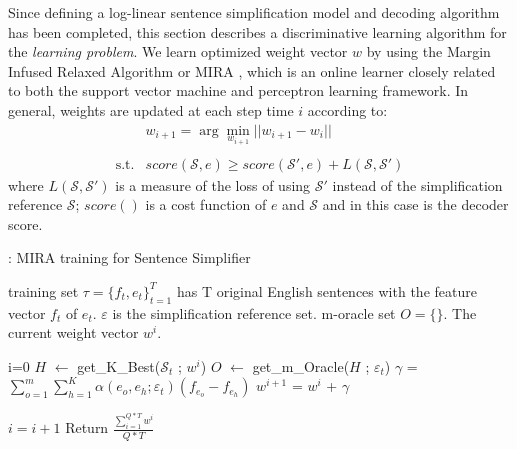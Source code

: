 \documentclass[10pt]{article}
\begin{document}
Since defining a log-linear sentence simplification model and decoding algorithm has been completed, this section describes a discriminative learning algorithm for the \textit{learning problem}.
We learn optimized weight vector $w$ by using the Margin Infused Relaxed Algorithm or MIRA \cite{MIRA:2003}, which is an online learner closely related to both the support vector machine and perceptron learning framework.
In general, weights are updated at each step time $i$ according to:
\begin{equation}
\begin{array}{cc}
& w_{i+1}  = \arg\min_{w_{i+1}} ||w_{i+1} - w_i||   \\
\\
\mbox{s.t.} & score(\mathcal{S},e) \geq score(\mathcal{S}',e) + L(\mathcal{S},\mathcal{S}') 
\end{array}
\end{equation}
where $L(\mathcal{S},\mathcal{S}')$ is a measure of the loss of using $\mathcal{S}'$ instead of the simplification reference $\mathcal{S}$; $score()$ is a cost function of $e$ and $\mathcal{S}$ and in this case is the decoder score.

\begin{algorithm}
	\caption{: MIRA training for Sentence Simplifier}
	\label{algo:MIRA}
	\begin{algorithmic}
		\STATE training set $\tau=\{f_t, e_t\}_{t=1}^{T}$ has T original English sentences with the feature vector $f_t$ of $e_t$.
		\STATE $\varepsilon$ is the simplification reference set.
		\STATE m-oracle set $O = \{\}$.
		\STATE The current weight vector $w^i$. 
	\end{algorithmic}	
	
	\begin{algorithmic}[1]
		\STATE i=0		
		\FOR{$j = 1$ to Q} 		
			\FOR {$t = 1$ to T} 
				\STATE $H$ $\gets$ get\_K\_Best($\mathcal{S}_t$ ; $w^i$)
				\STATE $O$ $\gets$ get\_m\_Oracle($H$ ; $\varepsilon_t$)
				\STATE $\gamma$ = $\sum\limits_{o=1}^m \sum\limits_{h=1}^{K} \alpha(e_o, e_h ; \varepsilon_t) (f_{e_o}  - f_{e_h})$
				\STATE $w^{i+1}$ = $w^i$ + $\gamma$
				
				\STATE $i = i + 1$
			\ENDFOR
		\ENDFOR
		\STATE Return $\frac{\sum_{i=1}^{Q*T} w^i}{Q*T}$
	\end{algorithmic}
\end{algorithm}
\end{document}
